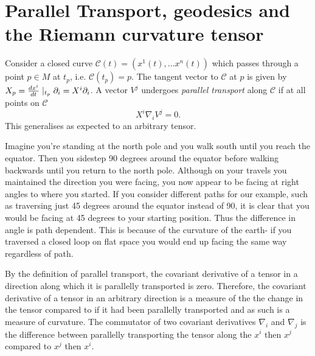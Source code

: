 \section{Parallel Transport, geodesics and the Riemann curvature tensor}
Consider a closed curve $\mathcal{C}(t)=(x^1(t),... x^n(t))$ which passes through a point $p \in M$ at $t_p$, i.e. $\mathcal{C}(t_p)=p$. The tangent vector to $\mathcal{C}$ at $p$ is given by $X_p = \frac{dx^i}{dt}\mid_{t_p} {\partial}_i = X^i {\partial}_i$. A vector $V^j$ undergoes \textit{parallel transport} along $\mathcal{C}$ if at all points on $\mathcal{C}$ 
\begin{equation}\label{ParaTrans}
X^i \nabla_i V^j = 0.
\end{equation}
This generalises as expected to an arbitrary tensor. 

Imagine you're standing at the north pole and you walk south until you reach the equator. Then you sidestep 90 degrees around the equator before walking backwards until you return to the north pole. Although on your travels you maintained the direction you were facing, you now appear to be facing at right angles to where you started. If you consider different paths for our example, such as traversing just 45 degrees around the equator instead of 90, it is clear that you would be facing at 45 degrees to your starting position. Thus the difference in angle is path dependent. This is because of the curvature of the earth- if you traversed a closed loop on flat space you would end up facing the same way regardless of path. 

By the definition of parallel transport, the covariant derivative of a tensor in a direction along which it is parallelly transported is zero. Therefore, the covariant derivative of a tensor in an arbitrary direction is a measure of the the change in the tensor compared to if it had been parallelly transported and as such is a measure of curvature. The commutator of two covariant derivatives $\nabla_i$ and $\nabla_j$ is the difference between parallelly transporting the tensor along the $x^i$ then $x^j$ compared to $x^j$ then $x^i$. 

